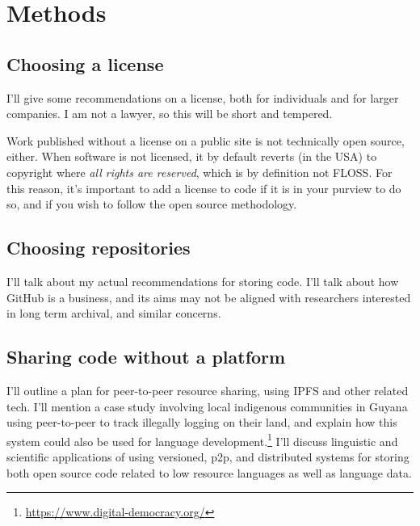 \section{Methods}
\label{sec:methods}

\subsection{Choosing a license}
\label{choosing-a-license}

I'll give some recommendations on a license, both for individuals and for larger companies. I am not a lawyer, so this will be short and tempered.

Work published without a license on a public site is not technically open source, either. When software is not licensed, it by default reverts (in the USA) to copyright where {\it all rights are reserved}, which is by definition not FLOSS. For this reason, it's important to add a license to code if it is in your purview to do so, and if you wish to follow the open source methodology. %

\subsection{Choosing repositories}
\label{choosing-repositories}

I'll talk about my actual recommendations for storing code. I'll talk about how GitHub is a business, and its aims may not be aligned with researchers interested in long term archival, and similar concerns.


\subsection{Sharing code without a platform}
\label{subsec:sharing-code-without-a-platform}

I'll outline a plan for peer-to-peer resource sharing, using IPFS \citep{benet2014ipfs} and other related tech. I'll mention a case study involving local indigenous communities in Guyana using peer-to-peer to track illegally logging on their land, and explain how this system could also be used for language development.\footnote{\href{https://www.digital-democracy.org/}{https://www.digital-democracy.org/}} I'll discuss linguistic and scientific applications of using versioned, p2p, and distributed systems for storing both open source code related to low resource languages as well as language data.